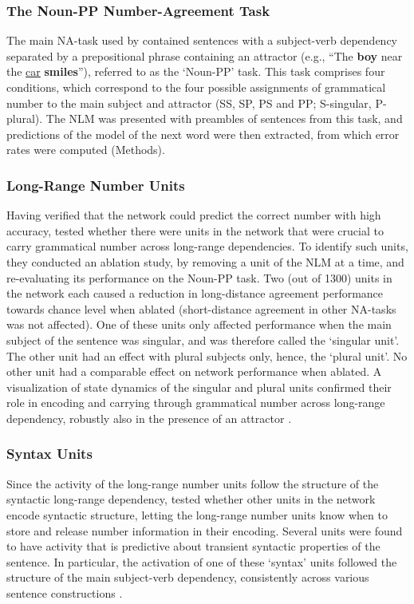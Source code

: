 \subsubsection{The Noun-PP Number-Agreement Task}
The main NA-task used by \citet{lakretz2019emergence} contained sentences with a subject-verb dependency separated by a prepositional phrase containing an attractor (e.g., ``The \textbf{boy} near the \underline{car} \textbf{smiles}''), referred to as the `Noun-PP' task. This task comprises four conditions, which correspond to the four possible assignments of grammatical number to the main subject and attractor (SS, SP, PS and PP; S-singular, P-plural). The NLM was presented with preambles of sentences from this task, and predictions of the model of the next word were then extracted, from which error rates were computed (Methods). 

\subsubsection{Long-Range Number Units}
Having verified that the network could predict the correct number with high accuracy, \citet{lakretz2019emergence} tested whether there were units in the network that were crucial to carry grammatical number across long-range dependencies.  To identify such units, they conducted an ablation study, by removing a unit of the NLM at a time, and re-evaluating its performance on the Noun-PP task. Two (out of 1300) units in the network each caused a reduction in long-distance agreement performance towards chance level when ablated (short-distance agreement in other NA-tasks was not affected). One of these units only affected performance when the main subject of the sentence was singular, and was therefore called the `singular unit'. The other unit had an effect with plural subjects only, hence, the `plural unit'. 
No other unit had a comparable effect on network performance when ablated. A visualization of state dynamics of the singular and plural units confirmed their role in encoding and carrying through grammatical number across long-range dependency, robustly also in the presence of an attractor \citep[figure 1 in][]{lakretz2019emergence}.

\subsubsection{Syntax Units}
Since the activity of the long-range number units follow the structure of the syntactic long-range dependency, \citet{lakretz2019emergence} tested whether other units in the network encode syntactic structure, letting the long-range number units know when to store and release number information in their encoding. Several units were found to have activity that is predictive about transient syntactic properties of the sentence. In particular, the activation of one of these `syntax' units followed the structure of the main subject-verb dependency, consistently across various sentence constructions \citep[figure 3 in][]{lakretz2019emergence}. 

